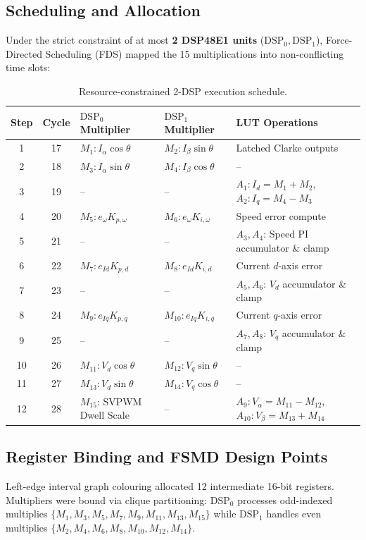 \documentclass[11pt,a4paper]{article}
\begin{document}
\subsection{Scheduling and Allocation}
Under the strict constraint of at most \textbf{2 DSP48E1 units} ($\text{DSP}_0, \text{DSP}_1$), Force-Directed Scheduling (FDS) mapped the 15 multiplications into non-conflicting time slots:

\begin{table}[H]\centering\small
\caption{Resource-constrained 2-DSP execution schedule.}\label{tab:schedule}
\begin{tabular}{@{}cclll@{}}
\toprule
Step & Cycle & $\text{DSP}_0$ Multiplier & $\text{DSP}_1$ Multiplier & LUT Operations\\
\midrule
1 & 17 & $M_1: I_\alpha \cos\theta$ & $M_2: I_\beta \sin\theta$ & Latched Clarke outputs\\
2 & 18 & $M_3: I_\alpha \sin\theta$ & $M_4: I_\beta \cos\theta$ & --\\
3 & 19 & -- & -- & $A_1: I_d = M_1 + M_2$, $A_2: I_q = M_4 - M_3$\\
4 & 20 & $M_5: e_\omega K_{p,\omega}$ & $M_6: e_\omega K_{i,\omega}$ & Speed error compute\\
5 & 21 & -- & -- & $A_3, A_4$: Speed PI accumulator \& clamp\\
6 & 22 & $M_7: e_{Id} K_{p,d}$ & $M_8: e_{Id} K_{i,d}$ & Current $d$-axis error\\
7 & 23 & -- & -- & $A_5, A_6$: $V_d$ accumulator \& clamp\\
8 & 24 & $M_9: e_{Iq} K_{p,q}$ & $M_{10}: e_{Iq} K_{i,q}$ & Current $q$-axis error\\
9 & 25 & -- & -- & $A_7, A_8$: $V_q$ accumulator \& clamp\\
10 & 26 & $M_{11}: V_d \cos\theta$ & $M_{12}: V_q \sin\theta$ & --\\
11 & 27 & $M_{13}: V_d \sin\theta$ & $M_{14}: V_q \cos\theta$ & --\\
12 & 28 & $M_{15}$: SVPWM Dwell Scale & -- & $A_9: V_\alpha = M_{11} - M_{12}$, $A_{10}: V_\beta = M_{13} + M_{14}$\\
\bottomrule
\end{tabular}
\end{table}

\subsection{Register Binding and FSMD Design Points}
Left-edge interval graph colouring allocated 12 intermediate 16-bit registers. Multipliers were bound via clique partitioning: $\text{DSP}_0$ processes odd-indexed multiplies $\{M_1, M_3, M_5, M_7, M_9, M_{11}, M_{13}, M_{15}\}$ while $\text{DSP}_1$ handles even multiplies $\{M_2, M_4, M_6, M_8, M_{10}, M_{12}, M_{14}\}$.
\end{document}
